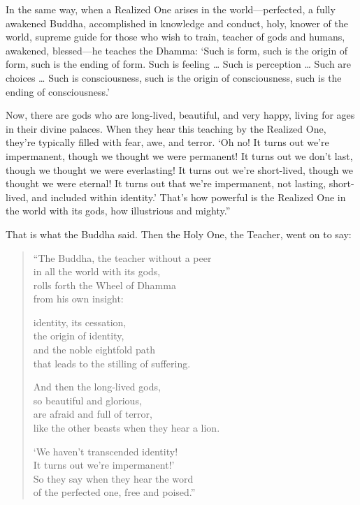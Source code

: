 \documentclass[12pt,openany]{book}%
\begin{document}
In the same way, when a Realized One arises in the world—perfected, a fully awakened Buddha, accomplished in knowledge and conduct, holy, knower of the world, supreme guide for those who wish to train, teacher of gods and humans, awakened, blessed—he teaches the Dhamma: ‘Such is form, such is the origin of form, such is the ending of form. Such is feeling … Such is perception … Such are choices … Such is consciousness, such is the origin of consciousness, such is the ending of consciousness.’ 

Now, there are gods who are long-lived, beautiful, and very happy, living for ages in their divine palaces. When they hear this teaching by the Realized One, they’re typically filled with fear, awe, and terror. ‘Oh no! It turns out we’re impermanent, though we thought we were permanent! It turns out we don’t last, though we thought we were everlasting! It turns out we’re short-lived, though we thought we were eternal! It turns out that we’re impermanent, not lasting, short-lived, and included within identity.’ That’s how powerful is the Realized One in the world with its gods, how illustrious and mighty.” 

That is what the Buddha said. Then the Holy One, the Teacher, went on to say: 

\begin{verse}%
“The Buddha, the teacher without a peer \\
in all the world with its gods, \\
rolls forth the Wheel of Dhamma \\
from his own insight: 

identity, its cessation, \\
the origin of identity, \\
and the noble eightfold path \\
that leads to the stilling of suffering. 

And then the long-lived gods, \\
so beautiful and glorious, \\
are afraid and full of terror, \\
like the other beasts when they hear a lion. 

‘We haven’t transcended identity! \\
It turns out we’re impermanent!’ \\
So they say when they hear the word \\
of the perfected one, free and poised.” 

%
\end{verse}
\end{document}
